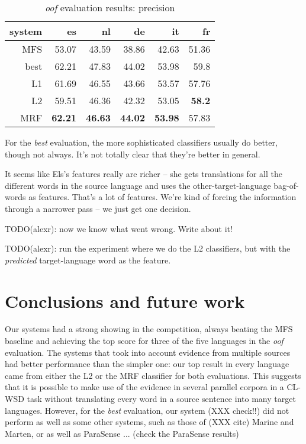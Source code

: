 \documentclass[11pt,letterpaper]{article}
\begin{document}
\begin{table}[t!]
  \begin{center}
    \begin{tabular}{|r|r|r|r|r|r|}
      \hline
      system   & es    & nl    & de    &  it   & fr \\
      \hline
    MFS & 53.07          & 43.59              & 38.86          & 42.63          & 51.36 \\
   best & 62.21          & 47.83              & 44.02          & 53.98          & 59.8 \\
      \hline
           L1  & 61.69          & 46.55              & 43.66          & 53.57          & 57.76 \\
           L2  & 59.51          & 46.36              & 42.32          & 53.05          & \textbf{58.2} \\
           MRF & \textbf{62.21} & \textbf{46.63}     & \textbf{44.02} & \textbf{53.98} & 57.83 \\
      \hline
    \end{tabular}
  \caption{\emph{oof} evaluation results: precision}
  \label{table:resultsbest}
  \end{center}
\end{table}

For the \emph{best} evaluation, the more sophisticated classifiers usually do
better, though not always. It's not totally clear that they're better in
general.

It seems like Els's features really are richer -- she gets translations for all
the different words in the source language and uses the other-target-language
bag-of-words as features. That's a lot of features. We're kind of forcing the
information through a narrower pass -- we just get one decision.

TODO(alexr): now we know what went wrong. Write about it!

TODO(alexr): run the experiment where we do the L2 classifiers, but with the
\emph{predicted} target-language word as the feature.

\section{Conclusions and future work}
Our systems had a strong showing in the competition, always beating the MFS
baseline and achieving the top score for three of the five languages in the
\emph{oof} evaluation. The systems that took into account evidence from
multiple sources had better performance than the simpler one: our top result in
every language came from either the L2 or the MRF classifier for both
evaluations. This suggests that it is possible to make use of the evidence in
several parallel corpora in a CL-WSD task without translating every word in a
source sentence into many target languages. However, for the \emph{best}
evaluation, our system (XXX check!!) did not perform as well as some other
systems, such as those of (XXX cite) Marine and Marten, or as well as ParaSense
... (check the ParaSense results)
\end{document}

